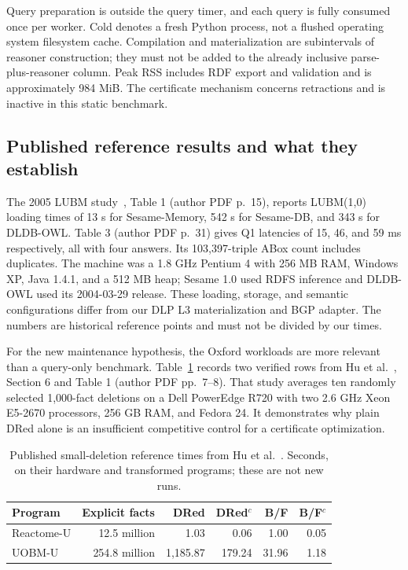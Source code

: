 Query preparation is outside the query timer, and each query is fully consumed
once per worker. Cold denotes a fresh Python process, not a flushed operating
system filesystem cache. Compilation and materialization are subintervals of
reasoner construction; they must not be added to the already inclusive
parse-plus-reasoner column. Peak RSS includes RDF export and validation and is
approximately 984 MiB. The certificate mechanism concerns retractions and is
inactive in this static benchmark.

\subsection{Published reference results and what they establish}
The 2005 LUBM study~\cite{guo2005}, Table 1 (author PDF p.~15), reports
LUBM(1,0) loading times of 13 s for Sesame-Memory, 542 s for Sesame-DB, and
343 s for DLDB-OWL. Table 3 (author PDF p.~31) gives Q1 latencies of 15, 46,
and 59 ms respectively, all with four answers. Its 103,397-triple ABox count
includes duplicates. The machine was a 1.8 GHz Pentium 4 with 256 MB RAM,
Windows XP, Java 1.4.1, and a 512 MB heap; Sesame 1.0 used RDFS inference and
DLDB-OWL used its 2004-03-29 release. These loading, storage, and semantic
configurations differ from our DLP L3 materialization and BGP adapter. The numbers
are historical reference points and must not be divided by our times.

For the new maintenance hypothesis, the Oxford workloads are more relevant
than a query-only benchmark. Table~\ref{tab:published-maintenance} records two
verified rows from Hu et al.~\cite{hu2018}, Section 6 and Table 1 (author PDF
pp.~7--8). That study averages ten randomly selected 1,000-fact deletions on a
Dell PowerEdge R720 with two 2.6 GHz Xeon E5-2670 processors, 256 GB RAM, and
Fedora 24. It demonstrates why plain DRed alone is an insufficient competitive
control for a certificate optimization.

\begin{table}[ht]
\caption{Published small-deletion reference times from Hu et al.~\cite{hu2018}.
Seconds, on their hardware and transformed programs; these are not new runs.}
\label{tab:published-maintenance}
\centering\small
\begin{tabular}{@{}lrrrrr@{}}
\toprule
Program & Explicit facts & DRed & DRed$^c$ & B/F & B/F$^c$ \\
\midrule
Reactome-U & 12.5 million & 1.03 & 0.06 & 1.00 & 0.05 \\
UOBM-U & 254.8 million & 1,185.87 & 179.24 & 31.96 & 1.18 \\
\bottomrule
\end{tabular}
\end{table}


